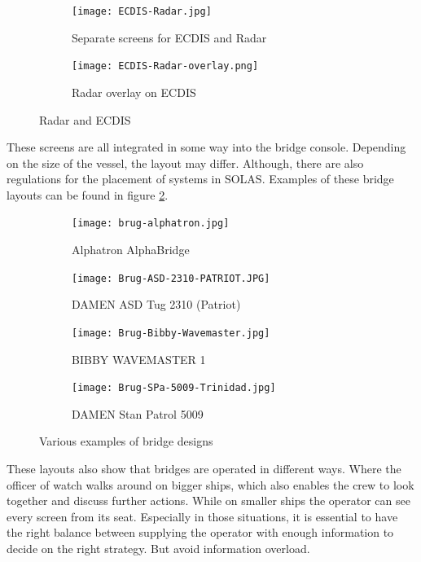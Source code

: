 \begin{figure}[p]
	\centering
	
	\begin{subfigure}[b]{0.6\textwidth}
		\texttt{[image: ECDIS-Radar.jpg]}
		\caption{Separate screens for ECDIS and Radar}
	\end{subfigure}
	\hfill
	\begin{subfigure}[b]{0.37\textwidth}
		\texttt{[image: ECDIS-Radar-overlay.png]}
		\caption{Radar overlay on ECDIS}
	\end{subfigure}
	
	\caption{Radar and ECDIS}
	\label{fig:ECDIS-example}
	
\end{figure}

These screens are all integrated in some way into the bridge console. Depending on the size of the vessel, the layout may differ. Although, there are also regulations for the placement of systems in \ac{SOLAS}. Examples of these bridge layouts can be found in figure \ref{fig:bridge-example}.

\begin{figure}[p]
	\centering
	
	\begin{subfigure}[b]{0.45\textwidth}
		\texttt{[image: brug-alphatron.jpg]}
		\caption{Alphatron AlphaBridge}
	\end{subfigure}
	\hfill
	\begin{subfigure}[b]{0.45\textwidth}
		\texttt{[image: Brug-ASD-2310-PATRIOT.JPG]}
		\caption{DAMEN ASD Tug 2310 (Patriot)}
	\end{subfigure}
	\hfill
	\begin{subfigure}[b]{0.45\textwidth}
		\texttt{[image: Brug-Bibby-Wavemaster.jpg]}
		\caption{BIBBY WAVEMASTER 1}
	\end{subfigure}
	\hfill
	\begin{subfigure}[b]{0.45\textwidth}
		\texttt{[image: Brug-SPa-5009-Trinidad.jpg]}
		\caption{DAMEN Stan Patrol 5009}
	\end{subfigure}    
	
	\caption{Various examples of bridge designs}
	\label{fig:bridge-example}
	
\end{figure}

These layouts also show that bridges are operated in different ways. Where the officer of watch walks around on bigger ships, which also enables the crew to look together and discuss further actions. While on smaller ships the operator can see every screen from its seat. Especially in those situations, it is essential to have the right balance between supplying the operator with enough information to decide on the right strategy. But avoid information overload.


